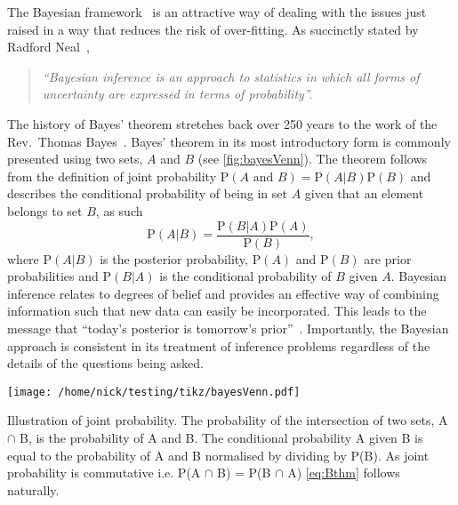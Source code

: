 The Bayesian framework~\cite{jeffreys1961,jaynes2003} is an attractive way of dealing with the issues just raised in a way that reduces the risk of over-fitting.
As succinctly stated by Radford Neal~\cite{neal1998},
\begin{quote}
  \emph{``Bayesian inference is an approach to statistics in which all forms of uncertainty are expressed in terms of probability''.}
\end{quote}
The history of Bayes' theorem stretches back over 250 years to the work of the Rev.\ Thomas Bayes~\cite{bayes1763}.
Bayes' theorem in its most introductory form is commonly presented using two sets, $A$ and $B$ (see \autoref{fig:bayesVenn}).
The theorem follows from the definition of joint probability $\mathrm{P}(A \text{ and } B) = \mathrm{P}(A|B) \mathrm{P}(B)$ and describes the conditional probability of being in set $A$ given that an element belongs to set $B$, as such 
\begin{equation}
  \mathrm{P}(A|B) = \frac{\mathrm{P}(B|A) \mathrm{P}(A)}{\mathrm{P}(B)},
  \label{eq:Bthm}
\end{equation}
where $\mathrm{P}(A|B)$ is the posterior probability, $\mathrm{P}(A)$ and $\mathrm{P}(B)$ are prior probabilities and $\mathrm{P}(B|A)$ is the conditional probability of $B$ given $A$.
Bayesian inference relates to degrees of belief and provides an effective way of combining information such that new data can easily be incorporated.
This leads to the message that ``today's posterior is tomorrow's prior''~\cite{lindley1972}.
Importantly, the Bayesian approach is consistent in its treatment of inference problems regardless of the details of the questions being asked.
\begin{marginfigure}[-400pt]
  \texttt{[image: /home/nick/testing/tikz/bayesVenn.pdf]}
  \caption{Illustration of joint probability.
    The probability of the intersection of two sets, A $\cap$ B, is the probability of A and B.
    The conditional probability A given B is equal to the probability of A and B normalised by dividing by P(B).
    As joint probability is commutative i.e. P(A $\cap$ B) = P(B $\cap$ A) \autoref{eq:Bthm} follows naturally.
  }
  \label{fig:bayesVenn}
\end{marginfigure}


